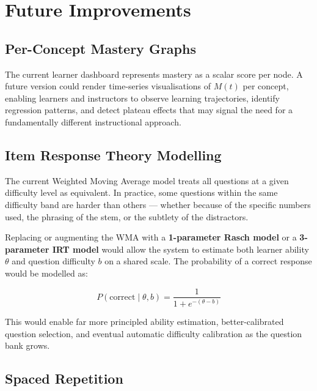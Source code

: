 \documentclass[12pt,a4paper]{article}
\begin{document}
\section{Future Improvements}

\subsection{Per-Concept Mastery Graphs}

The current learner dashboard represents mastery as a scalar score per node.
A future version could render time-series visualisations of $M(t)$ per
concept, enabling learners and instructors to observe learning trajectories,
identify regression patterns, and detect plateau effects that may signal the
need for a fundamentally different instructional approach.

\subsection{Item Response Theory Modelling}

The current Weighted Moving Average model treats all questions at a given
difficulty level as equivalent.  In practice, some questions within the same
difficulty band are harder than others — whether because of the specific
numbers used, the phrasing of the stem, or the subtlety of the distractors.

Replacing or augmenting the WMA with a \textbf{1-parameter Rasch model} or a
\textbf{3-parameter IRT model} would allow the system to estimate both learner
ability $\theta$ and question difficulty $b$ on a shared scale.  The
probability of a correct response would be modelled as:

\begin{equation}
  P(\text{correct} \mid \theta, b) = \frac{1}{1 + e^{-(\theta - b)}}
\end{equation}

This would enable far more principled ability estimation, better-calibrated
question selection, and eventual automatic difficulty calibration as the
question bank grows.

\subsection{Spaced Repetition}
\end{document}
